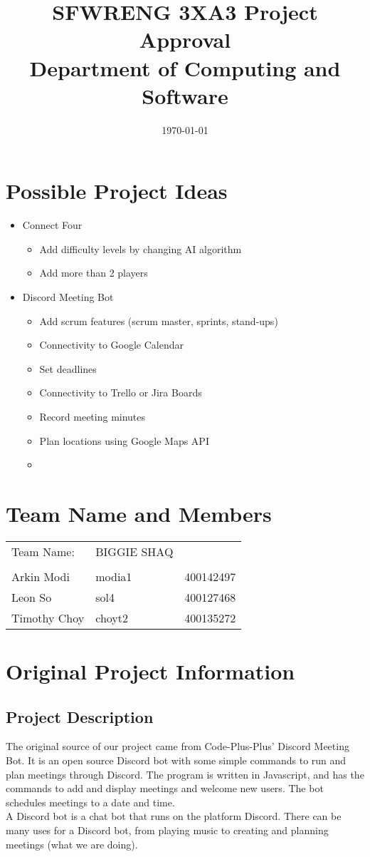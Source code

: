 \documentclass[12pt]{article}
\title{
    SFWRENG 3XA3 Project Approval\\
    \large Department of Computing and Software\\
}
\author{}
\date{\today}
\begin{document}
\maketitle

\section{Possible Project Ideas}
\begin{itemize}
    \item Connect Four
    \begin{itemize}
        \item Add difficulty levels by changing AI algorithm
        \item Add more than 2 players
    \end{itemize}
    \item Discord Meeting Bot
    \begin{itemize}
        \item Add scrum features (scrum master, sprints, stand-ups)
        \item Connectivity to Google Calendar
        \item Set deadlines
        \item Connectivity to Trello or Jira Boards
        \item Record meeting minutes
        \item Plan locations using Google Maps API
        \item 
    \end{itemize}
\end{itemize}


\section{Team Name and Members}

\begin{tabular}{l l l}
    Team Name: & BIGGIE SHAQ\\
    \\
    Arkin Modi & modia1 & 400142497 \\
    Leon So & sol4 & 400127468 \\
    Timothy Choy & choyt2 & 400135272
\end{tabular}

\section{Original Project Information}
\subsection{Project Description}
The original source of our project came from Code-Plus-Plus' Discord Meeting Bot. It is an open source Discord bot with some simple commands to run and plan meetings through Discord. The program is written in Javascript, and has the commands to add and display meetings and welcome new users. The bot schedules meetings to a date and time.\\
A Discord bot is a chat bot that runs on the platform Discord. There can be many uses for a Discord bot, from playing music to creating and planning meetings (what we are doing).
\end{document}
